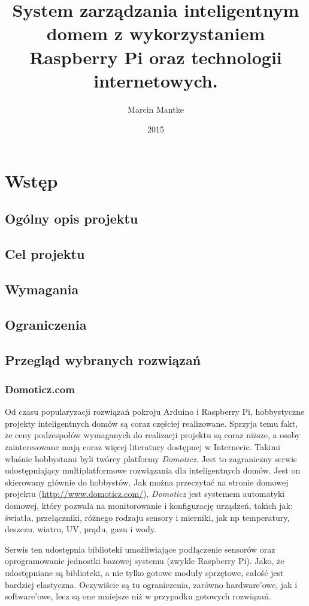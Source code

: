 \documentclass[eng,oneside]{mgr}
\author{Marcin Mantke}
\title{System zarządzania inteligentnym domem z wykorzystaniem Raspberry Pi oraz technologii internetowych.}
\date{2015}
\begin{document}
\maketitle
\tableofcontents
\chapter{Wstęp}
\section{Ogólny opis projektu}
\section{Cel projektu}
\section{Wymagania}
\section{Ograniczenia}



\section{Przegląd wybranych rozwiązań}
\subsection{Domoticz.com}
Od czasu popularyzacji rozwiązań pokroju Arduino i Raspberry Pi, hobbystyczne projekty inteligentnych domów są coraz częściej realizowane. Sprzyja temu fakt, że ceny podzespołów wymaganych do realizacji projektu są coraz niższe, a osoby zainteresowane mają coraz więcej literatury dostępnej w Internecie. Takimi właśnie hobbystami byli twórcy platformy \textit{Domoticz}. Jest to zagraniczny serwis udostępniający multiplatformowe rozwiązania dla inteligentnych domów. Jest on skierowany głównie do hobbystów. Jak można przeczytać na stronie domowej projektu (\url{http://www.domoticz.com/}), \textit{Domoticz} jest systemem automatyki domowej, który pozwala na monitorowanie i konfigurację urządzeń, takich jak: światła, przełączniki, różnego rodzaju sensory i mierniki, jak np temperatury, deszczu, wiatru, UV, prądu, gazu i wody.

Serwis ten udostępnia biblioteki umożliwiające podłączenie sensorów oraz oprogramowanie jednostki bazowej systemu (zwykle Raspberry Pi). Jako, że udostępniane są biblioteki, a nie tylko gotowe moduły sprzętowe, całość jest bardziej elastyczna. Oczywiście są tu ograniczenia, zarówno hardware'owe, jak i software'owe, lecz są one mniejsze niż w przypadku gotowych rozwiązań.
\end{document}
